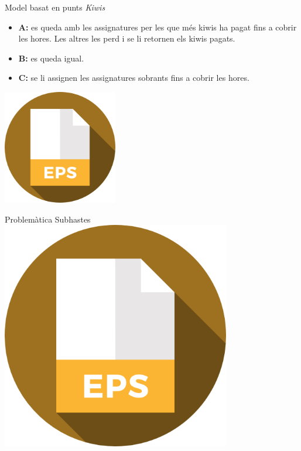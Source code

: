 \documentclass[twocolumn]{beamer}
\begin{document}
\begin{frame}{Model basat en punts \textit{Kiwis}}
\begin{itemize}
	\item \textbf{A:} es queda amb les assignatures per les que més kiwis ha pagat fins a cobrir les hores. Les altres les perd i se li retornen els kiwis pagats.
	\item \textbf{B:} es queda igual.
	\item \textbf{C:} se li assignen les assignatures sobrants fins a cobrir les hores. 
\end{itemize}
\centering
\includegraphics[width=5cm]{eps}
\end{frame}
\begin{frame}{Problemàtica Subhastes}
\includegraphics[width=10cm]{eps}
\end{frame}
\end{document}
